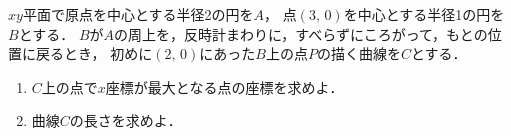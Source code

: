 \documentclass[../../main.tex]{subfiles}
\begin{document}
$xy$平面で原点を中心とする半径2の円を$A$，
点$(3, \, 0)$を中心とする半径1の円を$B$とする．
$B$が$A$の周上を，反時計まわりに，すべらずにころがって，もとの位置に戻るとき，
初めに$(2, \, 0)$にあった$B$上の点$P$の描く曲線を$C$とする．
\begin{enumerate}
  \item $C$上の点で$x$座標が最大となる点の座標を求めよ．
  \item 曲線$C$の長さを求めよ．
\end{enumerate}
\end{document}
